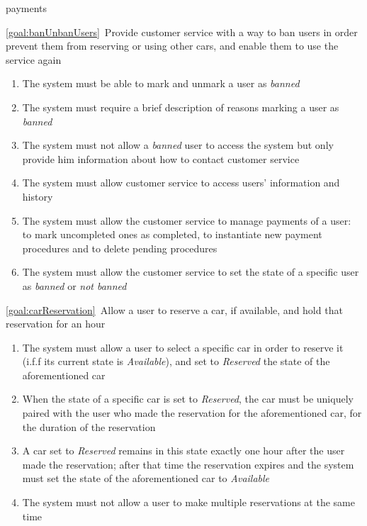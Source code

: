 \begin{description}
\begin{enumerate}[resume*]
  				payments
  			\end{enumerate}
  		\item \ref{goal:banUnbanUsers}\ Provide customer service with a way to ban users in order
  		prevent them from reserving or using other cars, and enable them to use the service again
  			\begin{enumerate}[resume*]
  				\item The system must be able to mark and unmark a user as \emph{banned} 
  				\item The system must require a brief description of reasons marking a user as
  				\emph{banned}
  				\item The system must not allow a \emph{banned} user to access the system but only
  				provide him information about how to contact customer service 
  				\item The system must allow customer service to access users' information and
  				history
  				\item The system must allow the customer service to manage payments
  				of a user: to mark uncompleted ones as completed, to instantiate new payment
  				procedures and to delete pending procedures
   				\item The system must allow the customer service to set the state of a
   				specific user as \emph{banned} or \emph{not banned}
   			\end{enumerate}
 	  	\item \ref{goal:carReservation}\ Allow a user to reserve a car, if available, and hold that
 	  	reservation for an hour
 	  		\begin{enumerate}[resume*]
 	  			\item The system must allow a user to select a specific car in order to reserve it 
 	  			(i.f.f its current state is \emph{Available}), and set to \emph{Reserved} the state of
 	  			the aforementioned car
 	  			\item When the state of a specific car is set to \emph{Reserved}, the car must be
 	  			uniquely paired with the user who made the reservation for the aforementioned car, for
 	  			the duration of the reservation
 	  			\item A car set to \emph{Reserved} remains in this state exactly one hour after the user
 	  			made the reservation; after that time the reservation expires and the system
 	  			must set the state of the aforementioned car to \emph{Available}
 	  			\item The system must not allow a user to make multiple reservations at the same time

\end{enumerate}
\end{description}

